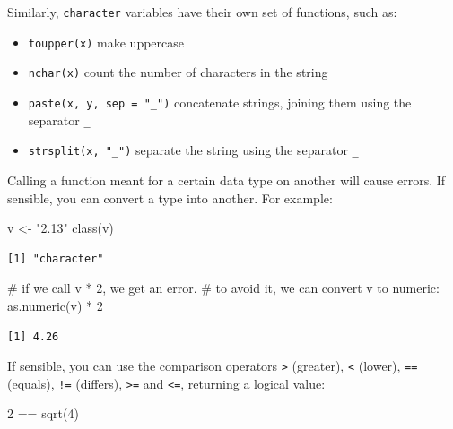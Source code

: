 \documentclass[
  letterpaper,
  DIV=11,
  numbers=noendperiod]{scrreprt}
\newenvironment{Shaded}{\begin{snugshade}}{\end{snugshade}}
\newcommand{\CommentTok}[1]{\textcolor[rgb]{0.37,0.37,0.37}{#1}}
\newcommand{\DecValTok}[1]{\textcolor[rgb]{0.68,0.00,0.00}{#1}}
\newcommand{\FunctionTok}[1]{\textcolor[rgb]{0.28,0.35,0.67}{#1}}
\newcommand{\NormalTok}[1]{\textcolor[rgb]{0.00,0.23,0.31}{#1}}
\newcommand{\OtherTok}[1]{\textcolor[rgb]{0.00,0.23,0.31}{#1}}
\newcommand{\SpecialCharTok}[1]{\textcolor[rgb]{0.37,0.37,0.37}{#1}}
\newcommand{\StringTok}[1]{\textcolor[rgb]{0.13,0.47,0.30}{#1}}
\providecommand{\tightlist}{%
  \setlength{\itemsep}{0pt}\setlength{\parskip}{0pt}}\usepackage{longtable,booktabs,array}
\begin{document}
Similarly, \texttt{character} variables have their own set of functions,
such as:

\begin{itemize}
\tightlist
\item
  \texttt{toupper(x)} make uppercase
\item
  \texttt{nchar(x)} count the number of characters in the string
\item
  \texttt{paste(x,\ y,\ sep\ =\ "\_")} concatenate strings, joining them
  using the separator \texttt{\_}
\item
  \texttt{strsplit(x,\ "\_")} separate the string using the separator
  \texttt{\_}
\end{itemize}

Calling a function meant for a certain data type on another will cause
errors. If sensible, you can convert a type into another. For example:

\begin{Shaded}
\begin{Highlighting}[]
\NormalTok{v }\OtherTok{\textless{}{-}} \StringTok{"2.13"}
\FunctionTok{class}\NormalTok{(v)}
\end{Highlighting}
\end{Shaded}

\begin{verbatim}
[1] "character"
\end{verbatim}

\begin{Shaded}
\begin{Highlighting}[]
\CommentTok{\# if we call v * 2, we get an error.}
\CommentTok{\# to avoid it, we can convert v to numeric:}
\FunctionTok{as.numeric}\NormalTok{(v) }\SpecialCharTok{*} \DecValTok{2} 
\end{Highlighting}
\end{Shaded}

\begin{verbatim}
[1] 4.26
\end{verbatim}

If sensible, you can use the comparison operators
\texttt{\textgreater{}} (greater), \texttt{\textless{}} (lower),
\texttt{==} (equals), \texttt{!=} (differs), \texttt{\textgreater{}=}
and \texttt{\textless{}=}, returning a logical value:

\begin{Shaded}
\begin{Highlighting}[]
\DecValTok{2} \SpecialCharTok{==} \FunctionTok{sqrt}\NormalTok{(}\DecValTok{4}\NormalTok{)}
\end{Highlighting}
\end{Shaded}
\end{document}

